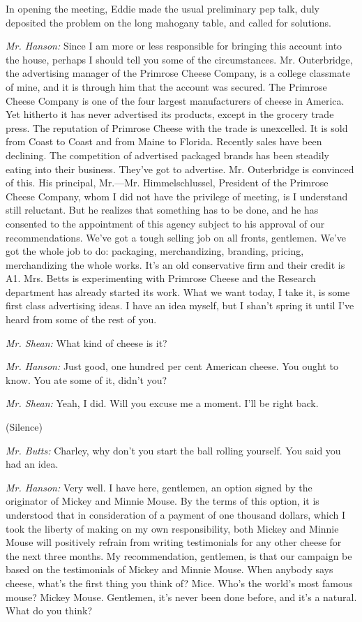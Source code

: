 \documentclass[nohyper,openany,nobib]{tufte-book}
\begin{document}
In opening the meeting, Eddie made the usual preliminary pep talk, duly
deposited the problem on the long mahogany table, and called for
solutions.

\emph{Mr. Hanson:} Since I am more or less responsible for bringing this
account into the house, perhaps I should tell you some of the
circumstances. Mr. Outerbridge, the advertising manager of the Primrose
Cheese Company, is a college classmate of mine, and it is through him
that the account was secured. The Primrose Cheese Company is one of the
four largest manufacturers of cheese in America. Yet hitherto it has
never advertised its products, except in the grocery trade press. The
reputation of Primrose Cheese with the trade is unexcelled. It is sold
from Coast to Coast and from Maine to Florida. Recently sales have been
declining. The competition of advertised packaged brands has been
steadily eating into their business. They've got to advertise. Mr.
Outerbridge is convinced of this. His principal, Mr.---Mr.
Himmelschlussel, President of the Primrose Cheese Company, whom I did
not have the privilege of meeting, is I understand still reluctant. But
he realizes that something has to be done, and he has consented to the
appointment of this agency subject to his approval of our
recommendations. We've got a tough selling job on all fronts, gentlemen.
We've got the whole job to do: packaging, merchandizing, branding,
pricing, merchandizing the whole works. It's an old conservative firm
and their credit is A1. Mrs. Betts is experimenting with Primrose Cheese
and the Research department has already started its work. What we want
today, I take it, is some first class advertising ideas. I have an idea
myself, but I shan't spring it until I've heard from some of the rest of
you.

\emph{Mr. Shean:} What kind of cheese is it?

\emph{Mr. Hanson:} Just good, one hundred per cent American cheese. You
ought to know. You ate some of it, didn't you?

\emph{Mr. Shean:} Yeah, I did. Will you excuse me a moment. I'll be
right back.

(Silence)

\emph{Mr. Butts:} Charley, why don't you start the ball rolling
yourself. You said you had an idea.

\emph{Mr. Hanson:} Very well. I have here, gentlemen, an option signed
by the originator of Mickey and Minnie Mouse. By the terms of this
option, it is understood that in consideration of a payment of one
thousand dollars, which I took the liberty of making on my own
responsibility, both Mickey and Minnie Mouse will positively refrain
from writing testimonials for any other cheese for the next three
months. My recommendation, gentlemen, is that our campaign be based on
the testimonials of Mickey and Minnie Mouse. When anybody says cheese,
what's the first thing you think of? Mice. Who's the world's most famous
mouse? Mickey Mouse. Gentlemen, it's never been done before, and it's a
natural. What do you think?
\end{document}
